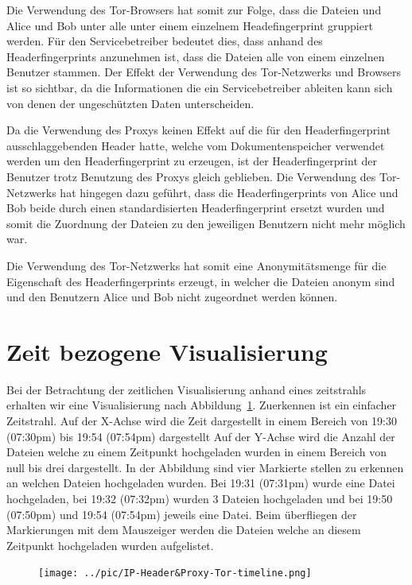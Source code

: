 \documentclass[
    fontsize=12pt,
    headings=small,
    parskip=half,           %
    bibliography=totoc,
    numbers=noenddot,       %
    open=any,               %
    ]{scrreprt}
\begin{document}
Die Verwendung des Tor-Browsers hat somit zur Folge, dass die Dateien und Alice und Bob unter alle unter einem einzelnem Headefingerprint gruppiert werden. 
Für den Servicebetreiber bedeutet dies, dass anhand des Headerfingerprints anzunehmen ist, dass die Dateien alle von einem einzelnen Benutzer stammen. 
Der Effekt der Verwendung des Tor-Netzwerks und Browsers ist so sichtbar, da die Informationen die ein Servicebetreiber ableiten kann sich von denen der ungeschützten Daten unterscheiden.

Da die Verwendung des Proxys keinen Effekt auf die für den Headerfingerprint ausschlaggebenden Header hatte, welche vom Dokumentenspeicher verwendet werden um den Headerfingerprint zu erzeugen, ist der Headerfingerprint der Benutzer trotz Benutzung des Proxys gleich geblieben. 
Die Verwendung des Tor-Netzwerks hat hingegen dazu geführt, dass die Headerfingerprints von Alice und Bob beide durch einen standardisierten Headerfingerprint ersetzt wurden und somit die Zuordnung der Dateien zu den jeweiligen Benutzern nicht mehr möglich war.

Die Verwendung des Tor-Netzwerks hat somit eine Anonymitätsmenge für die Eigenschaft des Headerfingerprints erzeugt, in welcher die Dateien anonym sind und den Benutzern Alice und Bob nicht zugeordnet werden können.

\section{Zeit bezogene Visualisierung}
Bei der Betrachtung der zeitlichen Visualisierung anhand eines zeitstrahls erhalten wir eine Visualisierung nach Abbildung~\ref{fig:TimeLine}.
Zuerkennen ist ein einfacher Zeitstrahl. 
Auf der X-Achse wird die Zeit dargestellt in einem Bereich von 19:30 (07:30pm) bis 19:54 (07:54pm) dargestellt
Auf der Y-Achse wird die Anzahl der Dateien welche zu einem Zeitpunkt hochgeladen wurden in einem Bereich von null bis drei dargestellt.
In der Abbildung sind vier Markierte stellen zu erkennen an welchen Dateien hochgeladen wurden.
Bei 19:31 (07:31pm) wurde eine Datei hochgeladen, bei 19:32 (07:32pm) wurden 3 Dateien hochgeladen und bei 19:50 (07:50pm) und 19:54 (07:54pm) jeweils eine Datei.
Beim überfliegen der Markierungen mit dem Mauszeiger werden die Dateien welche an diesem Zeitpunkt hochgeladen wurden aufgelistet.

\begin{figure}[H]
\texttt{[image: ../pic/IP-Header\&Proxy-Tor-timeline.png]}
\label{fig:TimeLine}
\end{figure}
\end{document}
